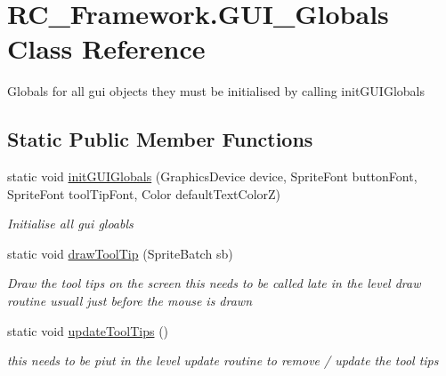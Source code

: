 \hypertarget{class_r_c___framework_1_1_g_u_i___globals}{}\section{R\+C\+\_\+\+Framework.\+G\+U\+I\+\_\+\+Globals Class Reference}
\label{class_r_c___framework_1_1_g_u_i___globals}


Globals for all gui objects they must be initialised by calling init\+G\+U\+I\+Globals  


\subsection*{Static Public Member Functions}
\begin{DoxyCompactItemize}
\item 
static void \mbox{\hyperlink{class_r_c___framework_1_1_g_u_i___globals_aeb5982129e2a0a38c7ce378ffb5426bf}{init\+G\+U\+I\+Globals}} (Graphics\+Device device, Sprite\+Font button\+Font, Sprite\+Font tool\+Tip\+Font, Color default\+Text\+ColorZ)
\begin{DoxyCompactList}\small\item\em Initialise all gui gloabls \end{DoxyCompactList}\item 
static void \mbox{\hyperlink{class_r_c___framework_1_1_g_u_i___globals_aee2de3108c9a937aaef3f152012eee9b}{draw\+Tool\+Tip}} (Sprite\+Batch sb)
\begin{DoxyCompactList}\small\item\em Draw the tool tips on the screen this needs to be called late in the level draw routine usuall just before the mouse is drawn \end{DoxyCompactList}\item 
static void \mbox{\hyperlink{class_r_c___framework_1_1_g_u_i___globals_a479ad86879c2b5d61eb0d1732d3531c3}{update\+Tool\+Tips}} ()
\begin{DoxyCompactList}\small\item\em this needs to be piut in the level update routine to remove / update the tool tips \end{DoxyCompactList}\end{DoxyCompactItemize}
